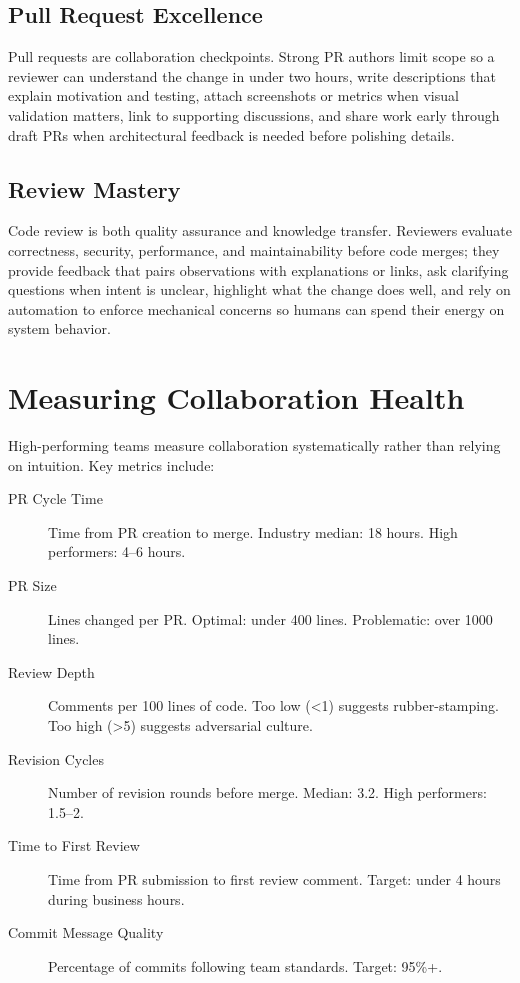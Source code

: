 \subsection{Pull Request Excellence}
Pull requests are collaboration checkpoints. Strong PR authors limit scope so a reviewer can understand the change in under two hours, write descriptions that explain motivation and testing, attach screenshots or metrics when visual validation matters, link to supporting discussions, and share work early through draft PRs when architectural feedback is needed before polishing details.

\subsection{Review Mastery}
Code review is both quality assurance and knowledge transfer. Reviewers evaluate correctness, security, performance, and maintainability before code merges; they provide feedback that pairs observations with explanations or links, ask clarifying questions when intent is unclear, highlight what the change does well, and rely on automation to enforce mechanical concerns so humans can spend their energy on system behavior.

\section{Measuring Collaboration Health}

High-performing teams measure collaboration systematically rather than relying on intuition. Key metrics include:

\begin{description}
  \item[PR Cycle Time] Time from PR creation to merge. Industry median: 18 hours. High performers: 4--6 hours.
  \item[PR Size] Lines changed per PR. Optimal: under 400 lines. Problematic: over 1000 lines.
  \item[Review Depth] Comments per 100 lines of code. Too low (<1) suggests rubber-stamping. Too high (>5) suggests adversarial culture.
  \item[Revision Cycles] Number of revision rounds before merge. Median: 3.2. High performers: 1.5--2.
  \item[Time to First Review] Time from PR submission to first review comment. Target: under 4 hours during business hours.
  \item[Commit Message Quality] Percentage of commits following team standards. Target: 95\%+.
\end{description}

